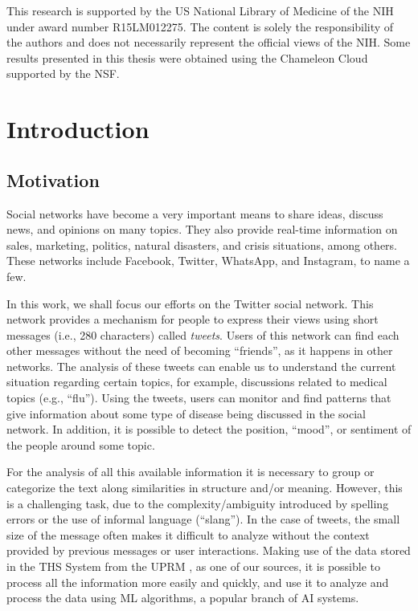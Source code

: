 \documentclass[12pt]{report}
\begin{document}
This research is supported by the \ac{US} National Library of Medicine of the \ac{NIH} under award number R15LM012275. The content is solely the responsibility of the authors and does not necessarily represent the official views of the \ac{NIH}. Some results presented in this thesis were obtained using the Chameleon Cloud supported by the \ac{NSF}.
\vfill
\doublespacing

\tableofcontents{}

\newpage
\printacronyms[include-classes=abbrev,name=List of Abbreviations]
\newpage
\listoffigures{}
\newpage
\listoftables{}

\newpage
{}

\fancyhf{}
\fancyhead[R]{\thepage} 
\renewcommand{\figurename}{Fig}
\onehalfspacing
\chapter{Introduction}\label{Chapter 1}
\doublespacing

\section{Motivation}
Social networks have become a very important means to share ideas, discuss news, and opinions on many topics.  They also provide real-time information on sales, marketing, politics, natural disasters, and crisis situations, among others. These networks include Facebook, Twitter, WhatsApp, and Instagram, to name a few. 

In this work, we shall focus our efforts on the Twitter social network. This network provides a mechanism for people to express their views using short messages (i.e., 280 characters)
called {\em tweets}. 
Users of this network can find each other messages without the need of becoming ``friends'', as it happens in other networks. The analysis of these tweets can enable us to understand the current situation regarding certain topics, for example, discussions related to medical topics (e.g., ``flu'').
Using the tweets, users can monitor and find patterns that give information about some type of disease being discussed in the social network. In addition, it is possible to detect the position,
``mood'', or sentiment of the people around some topic.

For the analysis of all this available information it is necessary to group or categorize the text along similarities in structure and/or meaning. However, this is a challenging task, due to the complexity/ambiguity introduced by  spelling errors or the use of informal language (``slang'').  In the case of tweets, the small size of the message often makes it difficult to analyze without the context provided by previous messages or user interactions. Making use of the data stored in the  \ac{THS} System from the \ac{UPRM} , as one of our sources, it is possible to process all the information more easily and quickly, and use it to analyze and process the data using  \ac{ML} algorithms, a popular branch of \ac{AI} systems.
\end{document}

